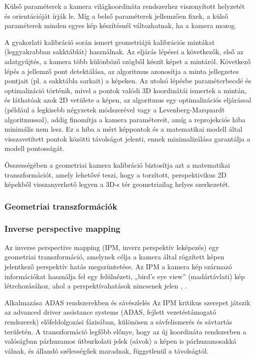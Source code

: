 Külső paraméterek a kamera világkoordináta rendszerhez viszonyított
helyzetét és orientációját írják le. Míg a belső paraméterek jellemzően
fixek, a külső paraméterek minden egyes kép készítésnél változhatnak, ha
a kamera mozog.

A gyakorlati kalibráció során ismert geometriájú kalibrációs mintákat
(leggyakrabban sakktáblát) használnak. Az eljárás lépései a következők,
első az adatgyűjtés, a kamera több különböző szögből készít képet a
mintáról. Következő lépés a jellemző pont detektálása, az algoritmus
azonosítja a minta jellegzetes pontjait (pl. a sakktábla sarkait) a
képeken. Az utolsó lépésbe paraméterbecslé és optimalizáció történik,
mivel a pontok valódi 3D koordinátái ismertek a mintán, és láthatóak
azok 2D vetülete a képen, az algoritmus egy optimalizációs eljárással
(például a legkisebb négyzetek módszerével vagy a Levenberg-Marquardt
algoritmussal), addig finomítja a kamera paramétereit, amíg a
reprojekciós hiba minimális nem lesz. Ez a hiba a mért képpontok és a
matematikai modell által visszavetített pontok közötti távolságot
jelenti, ennek minimalizálása garantálja a modell pontosságát.

Összességében a geometriai kamera kalibráció biztosítja azt a
matematikai transzformációt, amely lehetővé teszi, hogy a torzított,
perspektivikus 2D képekből visszanyerhető legyen a 3D-s tér
geometriailag helyes szerkezetét.

\subsubsection{Geometriai transzformációk}

\subsubsection*{Inverse perspective mapping}

Az inverse perspective mapping (IPM, inverz perspektív leképezés) egy
geometriai transzformáció, amelynek célja a kamera által rögzített képen
jelentkező perspektív hatás megszüntetése. Az IPM a kamera kép származó
információkat használja fel egy felülnézeti, „bird's eye view''
(madártávlati) kép létrehozásához, ahol a perspektívahatások nincsenek
jelen \cite{bertozzStereoInversePerspective1998}, \cite{oliveiraMultimodalInversePerspective2015}.

Alkalmazása ADAS rendszerekben és sávészlelés Az IPM kritikus szerepet
játszik az advanced driver assistance systems (ADAS, fejlett
vezetéstámogató rendszerek) előfeldolgozási fázisában, különösen a
sávfelismerés és sávtartás területén. A transzformáció legfőbb előnye,
hogy az új koordináta rendszerben a valóságban párhuzamos útburkolati
jelek (sávok) a képen is párhuzamosakká válnak, és állandó szélességűek
maradnak, függetlenül a távolságtól.

